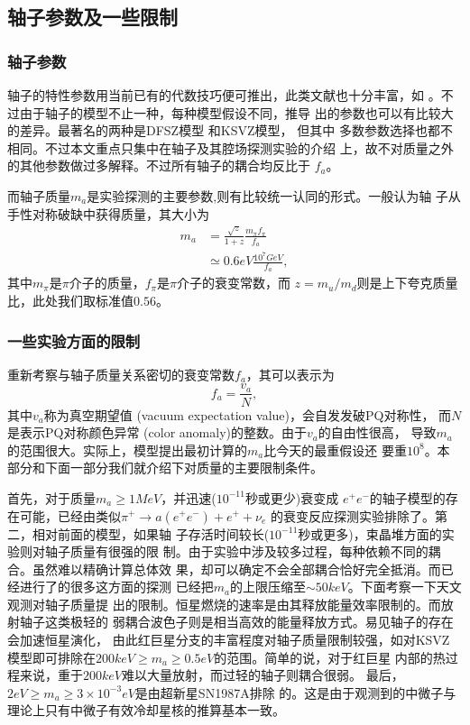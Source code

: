 \documentclass[twocolumn,12pt,a4paper]{article}
\begin{document}
\subsection{轴子参数及一些限制}
\subsubsection{轴子参数}
轴子的特性参数用当前已有的代数技巧便可推出，此类文献也十分丰富，如
\cite{weinberg78}。不过由于轴子的模型不止一种，每种模型假设不同，推导
出的参数也可以有比较大的差异。最著名的两种是DFSZ模型
\cite{zhitnitsky80}\cite{dine81}和KSVZ模型\cite{kim79}\cite{shifman80}，
但其中
多数参数选择也都不相同。不过本文重点只集中在轴子及其腔场探测实验的介绍
上，故不对质量之外的其他参数做过多解释。不过所有轴子的耦合均反比于
$f_a$。\par
而轴子质量$m_a$是实验探测的主要参数,则有比较统一认同的形式。一般认为轴
子从手性对称破缺中获得质量，其大小为
\begin{equation}
  \begin{split}
    m_a &= \frac{\sqrt{z}}{1+z}\frac{m_{\pi}f_{\pi}}{f_a} \\
        &\simeq 0.6 eV \frac{10^7GeV}{f_a},
  \end{split}
  \label{m:mass}
\end{equation}
其中$m_{\pi}$是$\pi$介子的质量，$f_{\pi}$是$\pi$介子的衰变常数，而
$z=m_u/m_d$则是上下夸克质量比，此处我们取标准值$0.56$。
\subsubsection{一些实验方面的限制}
重新考察与轴子质量关系密切的衰变常数$f_a$，其可以表示为
\begin{equation}
  f_a = \frac{v_a}{N},
  \label{m:fa}
\end{equation}
其中$v_a$称为真空期望值 (vacuum expectation value)，会自发发破PQ对称性，
而$N$是表示PQ对称颜色异常 (color anomaly)的整数。由于$v_a$的自由性很高，
导致$m_a$的范围很大。实际上，模型提出最初计算的$m_a$比今天的最重假设还
要重$10^8$。本部分和下面一部分我们就介绍下对质量的主要限制条件。\par
首先，对于质量$m_a \geq 1MeV$，并迅速($10^{-11}$秒或更少)衰变成
$e^+e^-$的轴子模型的存在可能，已经由类似$\pi^+ \rightarrow a(e^+ e^-)+e^++\nu_e$
的衰变反应探测实验排除了\cite{eichler86}。第二，相对前面的模型，如果轴
子存活时间较长($10^{-11}$秒或更多)，束晶堆方面的实验则对轴子质量有很强的限
制。由于实验中涉及较多过程，每种依赖不同的耦合。虽然难以精确计算总体效
果，却可以确定不会全部耦合恰好完全抵消。而已经进行了的很多这方面的探测\cite{pdg98}
已经把$m_a$的上限压缩至$\sim 50 keV$。下面考察一下天文观测对轴子质量提
出的限制。恒星燃烧的速率是由其释放能量效率限制的。而放射轴子这类极轻的
弱耦合波色子则是相当高效的能量释放方式。易见轴子的存在会加速恒星演化，
由此红巨星分支的丰富程度对轴子质量限制较强，如对KSVZ模型即可排除在$200keV
\geq m_a \geq 0.5eV$的范围\cite{raffelt87}。简单的说，对于红巨星
内部的热过程来说，重于$200keV$难以大量放射，而过轻的轴子则耦合很弱。
最后，$2eV \geq m_a \geq 3\times 10^{-3}eV$是由超新星SN1987A排除
的。这是由于观测到的中微子与理论上只有中微子有效冷却星核的推算基本一致。
\end{document}
